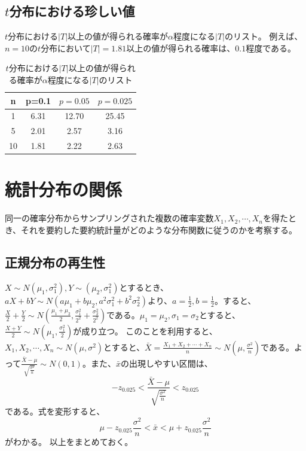 \subsection{$t$分布における珍しい値}
$t$分布における$|T|$以上の値が得られる確率が$\alpha$程度になる$|T|$のリスト。
例えば、$n=10$の$t$分布において$|T|=1.81$以上の値が得られる確率は、$0.1$程度である。


\begin{table}[hbtp]
    \caption{$t$分布における$|T|$以上の値が得られる確率が$\alpha$程度になる$|T|$のリスト}
    \label{table:student_t_confidence}
    \centering
    \begin{tabular}{cccc}
    n & p=0.1 & $p=0.05$ & $p=0.025$   \\
    \hline \hline
    1 & 6.31 & 12.70 & 25.45 \\
    5 & 2.01 &2.57  & 3.16\\
    10 & 1.81 &  2.22& 2.63 \\
      \hline
    \end{tabular}
  \end{table}


\section{統計分布の関係}
同一の確率分布からサンプリングされた複数の確率変数$X_1,X_2,\cdots,X_n$を得たとき、それを要約した要約統計量がどのような分布関数に従うのかを考察する。

\subsection{正規分布の再生性}
$X \sim N(\mu_1,\sigma^2_1),Y\sim(\mu_2,\sigma^2_1)$とするとき、$aX+bY \sim N(a\mu_1+b\mu_2,a^2\sigma^2_1+b^2\sigma^2_2)$より、$a=\frac{1}{2},b=\frac{1}{2}$。すると、$\frac{X}{2}+\frac{Y}{2}\sim N(\frac{\mu_1+\mu_2}{2},\frac{\sigma^2_1}{2^2}+\frac{\sigma^2_2}{2^2})$である。$\mu_1=\mu_2,\sigma_1=\sigma_2$とすると、$\frac{X+Y}{2}\sim N(\mu_1,\frac{\sigma^2_1}{2})$が成り立つ。
このことを利用すると、$X_1,X_2,\cdots,X_n\sim N(\mu,\sigma^2)$とすると、$\bar{X}=\frac{X_1+X_2+\cdots+X_n}{n}\sim N(\mu,\frac{\sigma^2}{n})$である。よって$\frac{\bar{X}-\mu}{\sqrt{\frac{\sigma^2}{n}}}\sim N(0,1) $。また、$\bar{x}$の出現しやすい区間は、
\begin{equation*}
    -z_{0.025}<\frac{\bar{X}-\mu}{\sqrt{\frac{\sigma^2}{n}}} < z_{0.025}
\end{equation*}
である。式を変形すると、
\begin{equation*}
    \mu-z_{0.025}\frac{\sigma^2}{n}<\bar{x}<\mu+z_{0.025}\frac{\sigma^2}{n}
\end{equation*}
がわかる。
以上をまとめておく。

